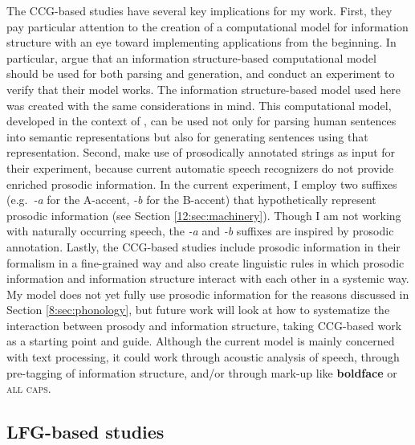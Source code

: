 The CCG-based studies have several key implications for my
work. First, they pay particular attention to the creation of a
computational model for information structure with an eye toward
implementing applications from the beginning.  In particular,
\citet{traat:bos:04} argue that an information structure-based
computational model should be used for both parsing and generation,
and conduct an experiment to verify that their model works.  The
information structure-based model used here was created with the same
considerations in mind. This computational model, developed in the
context of , can be used not only for parsing
human sentences into semantic representations but also for generating
sentences using that representation.  Second,
\citeauthor{traat:bos:04} make use of prosodically annotated strings
as input for their experiment, because current automatic speech
recognizers do not provide enriched prosodic information.  In the
current experiment, I employ two suffixes (e.g.\ 	\textit{-a} for the
A-accent, 	\textit{-b} for the B-accent) that hypothetically represent
prosodic information (see Section \ref{12:sec:machinery}).  Though I am not
working with naturally occurring speech, the 	\textit{-a} and 	\textit{-b} suffixes
are inspired by prosodic annotation.  Lastly, the CCG-based studies
include prosodic information in their formalism in a fine-grained way
and also create linguistic rules in which prosodic information and
information structure interact with each other in a systemic way.  My
model does not yet fully use prosodic information for the reasons
discussed in Section \ref{8:sec:phonology}, but future work will
look at how to systematize the interaction between prosody and
information structure, taking CCG-based work as a starting point and
guide.  Although the current model is mainly concerned with text
processing, it could work through acoustic analysis of speech, through
pre-tagging of information structure, and/or through mark-up like
\textbf{boldface} or \textsc{all caps}.





\subsection{LFG-based studies}
\label{8:ssec:lfg}



